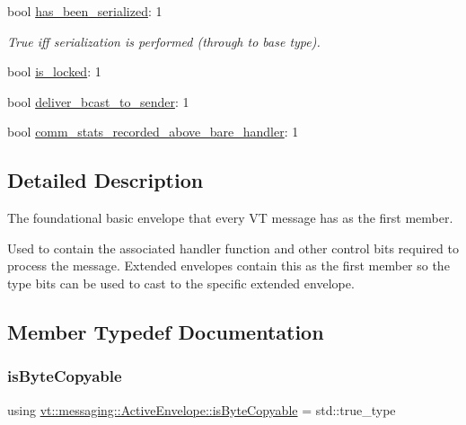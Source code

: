\begin{DoxyCompactItemize}
bool \hyperlink{structvt_1_1messaging_1_1_active_envelope_a340d6eae2a23ce99dc3e06f1ae2a5b81}{has\+\_\+been\+\_\+serialized}\+: 1
\begin{DoxyCompactList}\small\item\em True iff serialization is performed (through to base type). \end{DoxyCompactList}\item 
bool \hyperlink{structvt_1_1messaging_1_1_active_envelope_a17ded970dbc5c61160848d5ecf5c57ab}{is\+\_\+locked}\+: 1
\item 
bool \hyperlink{structvt_1_1messaging_1_1_active_envelope_aba7a8aaed2a99d0bfd72890e07397c0b}{deliver\+\_\+bcast\+\_\+to\+\_\+sender}\+: 1
\item 
bool \hyperlink{structvt_1_1messaging_1_1_active_envelope_a0fdee7342dfbb4b791fd7a3db5384570}{comm\+\_\+stats\+\_\+recorded\+\_\+above\+\_\+bare\+\_\+handler}\+: 1
\end{DoxyCompactItemize}


\subsection{Detailed Description}
The foundational basic envelope that every VT message has as the first member. 

Used to contain the associated handler function and other control bits required to process the message. Extended envelopes contain this as the first member so the type bits can be used to cast to the specific extended envelope. 

\subsection{Member Typedef Documentation}
\mbox{\label{structvt_1_1messaging_1_1_active_envelope_ad9d4a03838736cf7240bd25bc317fd3c}} 
\subsubsection{\texorpdfstring{is\+Byte\+Copyable}{isByteCopyable}}
{\footnotesize\ttfamily using \hyperlink{structvt_1_1messaging_1_1_active_envelope_ad9d4a03838736cf7240bd25bc317fd3c}{vt\+::messaging\+::\+Active\+Envelope\+::is\+Byte\+Copyable} =  std\+::true\+\_\+type}



